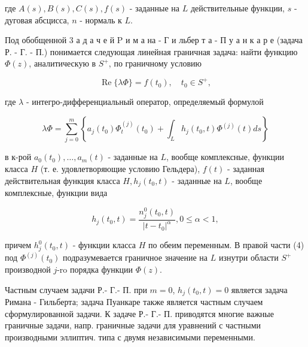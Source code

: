 \documentclass[10pt]{article}
\begin{document}
где $A(s), B(s), C(s), f(s)$ - заданные на $L$ действительные функции, $s$ - дуговая абсцисса, $n$ - нормаль к $L$.



Под обобщенной 3 а д а ч е й $\mathrm{P}$ и м а на - Г и льбер т а - П у а н к а р е (задача Р. - Г. - П.) понимается следующая линейная граничная задача: найти функцию $\Phi(z)$, аналитическую в $S^{+}$, по граничному условию



\[

\operatorname{Re}\{\lambda \Phi\}=f\left(t_{0}\right), \quad t_{0} \in S^{+},

\]



где $\lambda$ - интегро-дифференциальный оператор, определяемый формулой



\[

\lambda \Phi=\sum_{j=0}^{m}\left\{a_{j}\left(t_{0}\right) \Phi_{t}^{(j)}\left(t_{0}\right)+\int_{L} h_{j}\left(t_{0}, t\right) \Phi^{(j)}(t) d s\right\}

\]



в к-рой $a_{0}\left(t_{0}\right), \ldots, a_{m}(t)$ - заданные на $L$, вообще комплексные, функции класса $H$ (т. е. удовлетворяющие условию Гельдера), $f(t)$ - заданная действительная функция класса $H, h_{j}\left(t_{0}, t\right)$ - заданные на $L$, вообще комплексные, функции вида



\[

h_{j}\left(t_{0}, t\right)=\frac{n_{j}^{0}\left(t_{0}, t\right)}{\left|t-t_{0}\right|^{\alpha}}, 0 \leqslant \alpha<1,

\]



причем $h_{j}^{0}\left(t_{0}, t\right)$ - функции класса $H$ по обеим переменным. В правой части (4) под $\Phi^{(j)}\left(t_{0}\right)$ подразумевается граничное значение на $L$ изнутри области $S^{+}$производной $j$-ro порядка функции $\Phi(z)$.



Частным случаем задачи Р.- Г.- П. при $m=0$, $h_{j}\left(t_{0}, t\right)=0$ является задача Римана - Гильберта; задача Пуанкаре также является частным случаем сформулированной задачи. К задаче Р.- Г.- П. приводятся многие важные граничные задачи, напр. граничные задачи для уравнений с частными производными эллиптич. типа с двумя независимыми переменными.
\end{document}
